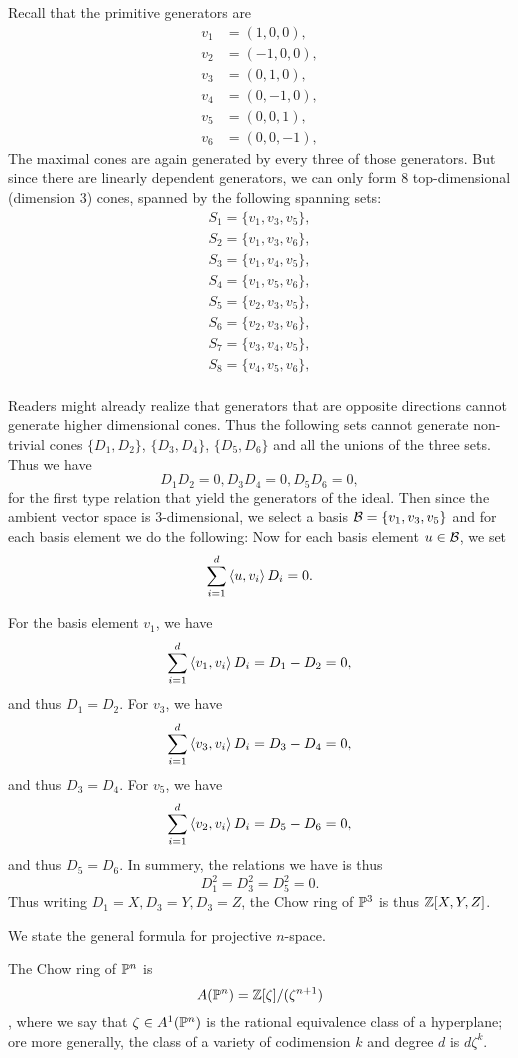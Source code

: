 	\begin{example}
		Recall that the primitive generators are 
		\begin{align*}
		v_1 &= (1, 0, 0), \\
		v_2 &= (-1, 0, 0), \\
		v_3 &= (0, 1, 0), \\
		v_4 &= (0, -1, 0), \\
		v_5 &= (0, 0, 1), \\
		v_6 &= (0, 0, -1),
		\end{align*}
		The maximal cones are again generated by 
		every three of those generators.
		But since there are linearly dependent generators,
		we can only form $8$ top-dimensional (dimension $3$) cones,
		spanned by the following spanning sets:
		\begin{align*}
		S_1 = \{v_1, v_3, v_5\}, \\
		S_2 = \{v_1, v_3, v_6\}, \\
		S_3 = \{v_1, v_4, v_5\}, \\
		S_4 = \{v_1, v_5, v_6\}, \\
		S_5 = \{v_2, v_3, v_5\}, \\
		S_6 = \{v_2, v_3, v_6\}, \\
		S_7 = \{v_3, v_4, v_5\}, \\
		S_8 = \{v_4, v_5, v_6\}, \\
		\end{align*}
		
		Readers might already realize that 
		generators that are opposite directions cannot generate 
		higher dimensional cones.
		Thus the following sets cannot generate non-trivial cones
		$\{D_1, D_2\}$, $\{D_3, D_4\}$, $\{D_5, D_6\}$
		and all the unions of the three sets. 
		Thus we have
		\[
		D_1D_2 = 0, D_3 D_4 = 0, D_5 D_6 = 0,
		\]
		for the first type relation that yield the generators of the ideal.
		Then since the ambient vector space is $3$-dimensional,
		we select a basis $\calb = \{v_1, v_3, v_5\}$
		and for each basis element we do the following:
		Now for each basis element $u \in \calb$,
		we set 
		\[
		\sum\limits_{i = 1}^{d} \inner{u, v_i} D_i = 0. 
		\] 

		 For the basis element $v_1$, we have
				\[
				\sum\limits_{i = 1}^d \inner{v_1, v_i} D_i 
				= D_1 -  D_2  = 0, 
				\] and thus $D_1 = D_2$. 
				For $v_3$, we have 
				\[
				\sum\limits_{i = 1}^d \inner{v_3, v_i} D_i 
				=  D_3 -  D_4  = 0, 
				\] and thus $D_3 = D_4$. 
				For $v_5$, we have 
				\[
				\sum\limits_{i = 1}^d \inner{v_2, v_i} D_i 
				= D_5 - D_6  = 0,
				\] and thus $D_5 = D_6$. 
		In summery, the relations we have is thus
		\[
		D_1^2 = D_3^2 = D_5^2 = 0.
		\]
		Thus writing $D_1 = X, D_3 = Y, D_3 = Z$,
		the Chow ring of $\P^3$ is thus $\Z[X, Y, Z]$.
	\end{example}
	
	We state the general formula for projective $n$-space. 
	\begin{theorem}
		The Chow ring of $\P^n$ is 
		\[
		A(\P^n) = \Z[\zeta]/(\zeta^{n+1})
		\],
		where we say that $\zeta \in A^1(\P^n)$ 
		is the rational equivalence class of a hyperplane;
		ore more generally, the class of a variety of codimension $k$ 
		and degree $d$ is $d \zeta^k$.
	\end{theorem}